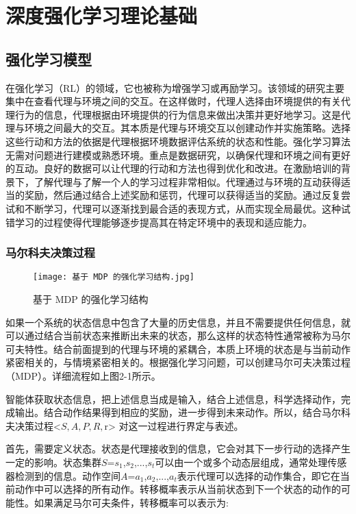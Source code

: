 \chapter{深度强化学习理论基础}

\section{强化学习模型}

在强化学习（RL）的领域，它也被称为增强学习或再励学习。该领域的研究主要集中在查看代理与环境之间的交互。在这样做时，代理人选择由环境提供的有关代理行为的信息，代理根据由环境提供的行为信息来做出决策并更好地学习。这是代理与环境之间最大的交互。其本质是代理与环境交互以创建动作并实施策略。选择这些行动和方法的依据是代理根据环境数据评估系统的状态和性能。强化学习算法无需对问题进行建模或熟悉环境。重点是数据研究，以确保代理和环境之间有更好的互动。良好的数据可以让代理的行动和方法也得到优化和改进。在激励培训的背景下，了解代理与了解一个人的学习过程非常相似。代理通过与环境的互动获得适当的奖励，然后通过结合上述奖励和惩罚，代理可以获得适当的奖励。通过反复尝试和不断学习，代理可以逐渐找到最合适的表现方式，从而实现全局最优。这种试错学习的过程使得代理能够逐步提高其在特定环境中的表现和适应能力。

\subsection{马尔科夫决策过程}


\begin{figure}[hbt]
	\centering
	\texttt{[image: 基于 MDP 的强化学习结构.jpg]}
	\caption{基于 MDP 的强化学习结构}
	\label{f.example}
\end{figure}

如果一个系统的状态信息中包含了大量的历史信息，并且不需要提供任何信息，就可以通过结合当前状态来推断出未来的状态，那么这样的状态特性通常被称为马尔可夫特性。结合前面提到的代理与环境的紧耦合，本质上环境的状态是与当前动作紧密相关的，与情境紧密相关的。根据强化学习问题，可以创建马尔可夫决策过程（MDP）\cite{garcia2013markov}。详细流程如上图2-1所示。

智能体获取状态信息，把上述信息当成是输入，结合上述信息，科学选择动作，完成输出。结合动作结果得到相应的奖励，进一步得到未来动作。所以，结合马尔科夫决策过程<$S,A,P,R,$r>
对这一过程进行界定与表述。

首先，需要定义状态。状态是代理接收到的信息，它会对其下一步行动的选择产生一定的影响。状态集群$S$={${s_{1}}$,${s_{2}}$,...,${s_{t}}$}可以由一个或多个动态层组成，通常处理传感器检测到的信息。动作空间$A$={${a_{1}}$,${a_{2}}$,...,${a_{t}}$}表示代理可以选择的动作集合，即它在当前动作中可以选择的所有动作。转移概率表示从当前状态到下一个状态的动作的可能性。如果满足马尔可夫条件，转移概率可以表示为:

